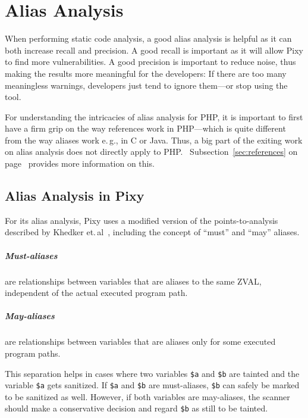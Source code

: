 \chapter{Alias Analysis}

When performing static code analysis, a good alias analysis is helpful as it can both increase recall and precision. A good recall is important as it will allow Pixy to find more vulnerabilities. A good precision is important to reduce noise, thus making the results more meaningful for the developers: If there are too many meaningless warnings, developers just tend to ignore them---or stop using the tool.~\cite{understanding-value}

For understanding the intricacies of alias analysis for PHP, it is important to first have a firm grip on the way references work in PHP---which is quite different from the way aliases work e.\,g., in C or Java. Thus, a big part of the exiting work on alias analysis does not directly apply to PHP.~\cite[page~24]{pixy} Subsection~\ref{sec:references} on page~\pageref{sec:references} provides more information on this.

\section{Alias Analysis in Pixy}

For its alias analysis, Pixy uses a modified version of the points-to-analysis described by Khedker et.\,al~\cite[page 119ff]{data-flow-analysis}, including the concept of ``must'' and ``may'' aliases.

\paragraph{Must-aliases} are relationships between variables that are aliases to the same ZVAL, independent of the actual executed program path.

\paragraph{May-aliases} are relationships between variables that are aliases only for some executed program paths.

This separation helps in cases where two variables \texttt{\$a} and \texttt{\$b} are tainted and the variable \texttt{\$a} gets sanitized. If \texttt{\$a} and \texttt{\$b} are must-aliases, \texttt{\$b} can safely be marked to be sanitized as well. However, if both variables are may-aliases, the scanner should make a conservative decision and regard \texttt{\$b} as still to be tainted.

